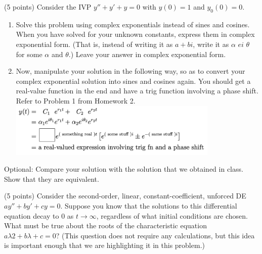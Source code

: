 \documentclass[11pt,letterpaper,boxed]{hmcpset}
\begin{document}
\pagebreak


\begin {problem} [4]
(5 points) Consider the IVP $y'' + y' + y = 0$ with $y(0) = 1$ and $y_0(0) = 0$.

\begin {enumerate}
\item Solve this problem using complex exponentials instead of sines and cosines. When you have solved for your unknown constants, express them in complex exponential form. (That is, instead of writing it as $a + bi$, write it as $\alpha$ $ei$ $\theta$ for some $\alpha$ and $\theta$.) Leave your answer in complex exponential form.
\item Now, manipulate your solution in the following way, so as to convert your complex exponential solution into sines and cosines again. You should get a real-value function in the end and have a trig function involving a phase shift. Refer to Problem 1 from Homework 2.
\centering
\includegraphics[width=100mm]{HW4/p4.png}
\end{enumerate}
Optional: Compare your solution with the solution that we obtained in class. Show that they are equivalent.
\end{problem}


\pagebreak

\begin{problem}
(5 points) Consider the second-order, linear, constant-coefficient, unforced DE $ay'' + by' + cy = 0$. Suppose you know that the solutions to this differential equation decay to 0 as $t \rightarrow \infty$, regardless of what initial conditions are chosen. What must be true about the roots of the characteristic equation $a\lambda 2 + b\lambda + c = 0$? (This question does not require any calculations, but this idea is important enough that we are highlighting it in this problem.)
\end{problem}


\pagebreak
\end{document}
